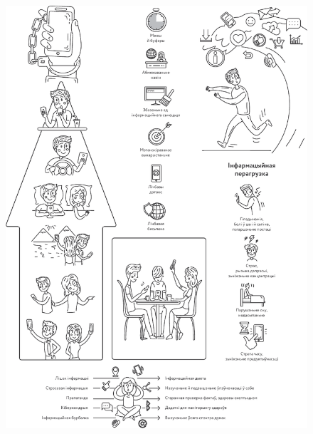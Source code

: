 \clearpage
\thispagestyle{empty}
\begin{figure}[htb!]
  \vspace*{-0.25in}
  \includegraphics[width=\textwidth]{willpower/ch13/full.pdf}  
\end{figure}
